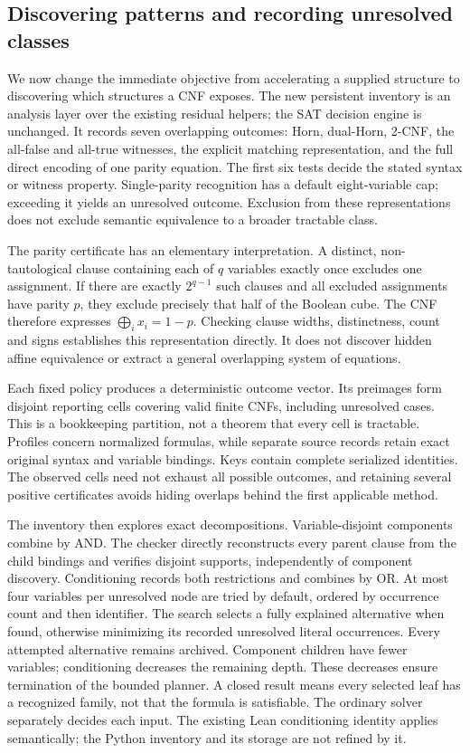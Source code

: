 \documentclass[11pt,a4paper]{article}
\numberwithin{equation}{section}
\theoremstyle{plain}
\theoremstyle{definition}
\theoremstyle{remark}
\begin{document}
\subsection{Discovering patterns and recording unresolved classes}
\label{sec:pattern-inventory}

We now change the immediate objective from accelerating a supplied structure to discovering which structures a CNF exposes. The new persistent inventory is an analysis layer over the existing residual helpers; the SAT decision engine is unchanged. It records seven overlapping outcomes: Horn, dual-Horn, 2-CNF, the all-false and all-true witnesses, the explicit matching representation, and the full direct encoding of one parity equation. The first six tests decide the stated syntax or witness property. Single-parity recognition has a default eight-variable cap; exceeding it yields an unresolved outcome. Exclusion from these representations does not exclude semantic equivalence to a broader tractable class.

The parity certificate has an elementary interpretation. A distinct, non-tautological clause containing each of $q$ variables exactly once excludes one assignment. If there are exactly $2^{q-1}$ such clauses and all excluded assignments have parity $p$, they exclude precisely that half of the Boolean cube. The CNF therefore expresses $\bigoplus_i x_i=1-p$. Checking clause widths, distinctness, count and signs establishes this representation directly. It does not discover hidden affine equivalence or extract a general overlapping system of equations.

Each fixed policy produces a deterministic outcome vector. Its preimages form disjoint reporting cells covering valid finite CNFs, including unresolved cases. This is a bookkeeping partition, not a theorem that every cell is tractable. Profiles concern normalized formulas, while separate source records retain exact original syntax and variable bindings. Keys contain complete serialized identities. The observed cells need not exhaust all possible outcomes, and retaining several positive certificates avoids hiding overlaps behind the first applicable method.

The inventory then explores exact decompositions. Variable-disjoint components combine by AND. The checker directly reconstructs every parent clause from the child bindings and verifies disjoint supports, independently of component discovery. Conditioning records both restrictions and combines by OR. At most four variables per unresolved node are tried by default, ordered by occurrence count and then identifier. The search selects a fully explained alternative when found, otherwise minimizing its recorded unresolved literal occurrences. Every attempted alternative remains archived. Component children have fewer variables; conditioning decreases the remaining depth. These decreases ensure termination of the bounded planner. A closed result means every selected leaf has a recognized family, not that the formula is satisfiable. The ordinary solver separately decides each input. The existing Lean conditioning identity applies semantically; the Python inventory and its storage are not refined by it.
\end{document}
